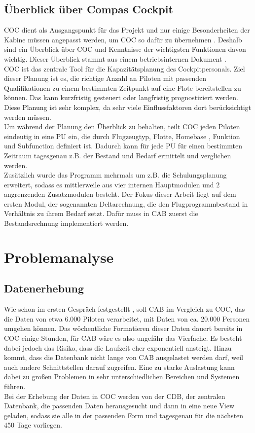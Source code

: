 \documentclass [12pt, a4paper, oneside, titlepage, ngerman]{article}
\begin{document}
\subsection{Überblick über Compas Cockpit}
\ac{COC} dient als Ausgangspunkt für das Projekt und nur einige Besonderheiten der Kabine müssen angepasst werden, um \ac{COC} so dafür zu übernehmen \cite[vgl.][]{Gespraech1}. Deshalb sind ein Überblick über \ac{COC} und Kenntnisse der wichtigsten Funktionen davon wichtig. Dieser Überblick stammt aus einem betriebsinternen Dokument \cite[vgl.][]{compasdoku}. \\
\ac{COC} ist das zentrale Tool für die Kapazitätsplanung des Cockpitpersonals. Ziel dieser Planung ist es, die richtige Anzahl an Piloten mit passenden Qualifikationen zu einem bestimmten Zeitpunkt auf eine Flote bereitstellen zu können. Das kann kurzfristig gesteuert oder langfristig prognostiziert werden. Diese Planung ist sehr komplex, da sehr viele Einflussfaktoren dort berücksichtigt werden müssen. \\
Um während der Planung den Überblick zu behalten, teilt \ac{COC} jeden Piloten eindeutig in eine \ac{PU} ein, die durch Flugzeugtyp, Flotte, Homebase %
, Funktion und Subfunction %
definiert ist. Dadurch kann für jede \ac{PU} für einen bestimmten Zeitraum tagesgenau z.B. der Bestand und Bedarf ermittelt und verglichen werden. \\
Zusätzlich wurde das Programm mehrmals um z.B. die Schulungsplanung erweitert, sodass es mittlerweile aus vier internen Hauptmodulen und 2 angrenzenden Zusatzmodulen besteht. %
Der Fokus dieser Arbeit liegt auf dem ersten Modul, der sogenannten Deltarechnung, die den Flugprogrammbestand in Verhältnis zu ihrem Bedarf setzt. Dafür muss in \ac{CAB} zuerst die Bestandsrechnung implementiert werden. 

\newpage

\section{Problemanalyse}
\subsection{Datenerhebung}
Wie schon im ersten Gespräch festgestellt \cite[vgl.][]{Gespraech1}, soll \ac{CAB} im Vergleich zu \ac{COC}, das die Daten von etwa 6.000 Piloten verarbeitet, mit Daten von ca. 20.000 Personen umgehen können. Das wöchentliche Formatieren dieser Daten dauert bereits in \ac{COC} einige Stunden, für \ac{CAB} wäre es also ungefähr das Vierfache. Es besteht dabei jedoch das Risiko, dass die Laufzeit eher exponentiell ansteigt. Hinzu kommt, dass die Datenbank nicht lange von \ac{CAB} ausgelastet werden darf, weil auch andere Schnittstellen darauf zugreifen. Eine zu starke Auslastung kann dabei zu großen Problemen in sehr unterschiedlichen Bereichen und Systemen führen. \\
Bei der Erhebung der Daten in \ac{COC} werden von der \ac{CDB}, der zentralen Datenbank, die passenden Daten herausgesucht und dann in eine neue View geladen, sodass sie alle in der passenden Form und tagesgenau für die nächsten 450 Tage vorliegen. \\
\end{document}
